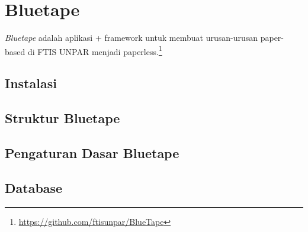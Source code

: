 \section{Bluetape}

\textit{Bluetape} adalah aplikasi + framework untuk membuat urusan-urusan paper-based di FTIS UNPAR menjadi paperless.\footnote{\url{https://github.com/ftisunpar/BlueTape}}

\subsection{Instalasi}

\subsection{Struktur Bluetape}

\subsection{Pengaturan Dasar Bluetape}

\subsection{Database}